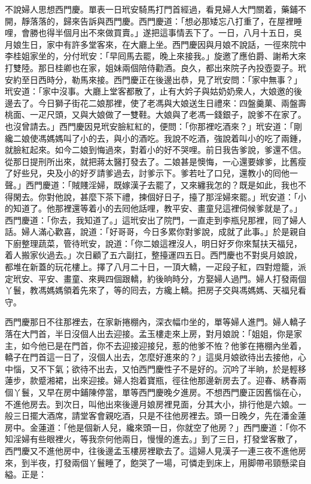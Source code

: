 不說婦人思想西門慶。單表一日玳安騎馬打門首經過，看見婦人大門關着，藥鋪不開，靜落落的，歸來告訴與西門慶。西門慶道：「想必那矮忘八打重了，在屋裡睡哩，會勝也得半個月出不來做買賣。」遂把這事情丟下了。一日，八月十五日，吳月娘生日，家中有許多堂客來，在大廳上坐。西門慶因與月娘不說話，一徑來院中李桂姐家坐的，分付玳安：「早囘馬去罷，晚上來接我。」旋邀了應伯爵、謝希大來打雙陸。那日桂卿也在家，姐妹兩個陪侍勸酒。良久，都出來院子內投壺耍子。玳安約至日西時分，勒馬來接。西門慶正在後邊出恭，見了玳安問：「家中無事？」玳安道：「家中沒事。大廳上堂客都散了，止有大妗子與姑奶奶衆人，大娘邀的後邊去了。今日獅子街花二娘那裡，使了老馮與大娘送生日禮來：{}四盤羹菓、兩盤壽桃面、一疋尺頭，又與大娘做了一雙鞋。大娘與了老馮一錢銀子，說爹不在家了。也沒曾請去。」{}西門慶因見玳安臉紅紅的，便問：「你那裡吃酒來？」玳安道：「剛纔二娘使馮媽媽叫了小的去，與小的酒吃。我說不吃酒，強說着叫小的吃了兩鍾，就臉紅起來。{}如今二娘到悔過來，對着小的好不哭哩。前日我告爹說，爹還不信。從那日提刑所出來，就把蔣太醫打發去了。二娘甚是懊悔，一心還要嫁爹，比舊瘦了好些兒，央及小的好歹請爹過去，討爹示下。爹若吐了口兒，還教小的囘他一聲。」西門慶道：「賊賤淫婦，既嫁漢子去罷了，又來纏我怎的？既是如此，我也不得閑去。你對他說，甚麼下茶下禮，揀個好日子，擡了那淫婦來罷。」{}玳安道：「小的知道了。他那裡還等着小的去囘他話哩，教平安、畫童兒這裡伺候爹就是了。」西門慶道：「你去，我知道了。」這玳安出了院門，一直走到李瓶兒那裡，囘了婦人話。婦人滿心歡喜，說道：「好哥哥，今日多累你對爹說，成就了此事。」於是親自下廚整理蔬菜，管待玳安，說道：「你二娘這裡沒人，明日好歹你來幫扶天福兒，着人搬家伙過去。」次日顧了五六副扛，整擡運四五日。西門慶也不對吳月娘說，都堆在新蓋的玩花樓上。擇了八月二十日，一頂大轎，一疋段子紅，四對燈籠，派定玳安、平安、畫童、來興四個跟轎，約後晌時分，方娶婦人過門。婦人打發兩個丫鬟，教馮媽媽領着先來了，等的囘去，方纔上轎。把房子交與馮媽媽、天福兒看守。

西門慶那日不往那裡去，在家新捲棚內，深衣幅巾坐的，單等婦人進門。婦人轎子落在大門首，半日沒個人出去迎接。{}孟玉樓走來上房，對月娘說：「姐姐，你是家主，如今他已是在門首，你不去迎接迎接兒，惹的他爹不恠？他爹在捲棚內坐着，轎子在門首這一日了，沒個人出去，怎麼好進來的？」這吳月娘欲待出去接他，心中惱，又不下氣；欲待不出去，又怕西門慶性子不是好的。沉吟了半晌，於是輕移蓮步，款蹙湘裙，出來迎接。婦人抱着寶瓶，徑往他那邊新房去了。迎春、綉春兩個丫鬟，又早在房中鋪陳停當，單等西門慶晚夕進房。不想西門慶正因舊惱在心，不進他房去。到次日，叫他出來後邊月娘房裡見面，分其大小，排行他是六娘。一般三日擺大酒席，請堂客會親吃酒，只是不往他房裡去。頭一日晚夕，先在潘金蓮房中。金蓮道：「他是個新人兒，{}纔來頭一日，你就空了他房？」西門慶道：「你不知淫婦有些眼裡火，等我奈何他兩日，慢慢的進去。」到了三日，打發堂客散了，西門慶又不進他房中，往後邊孟玉樓房裡歇去了。這婦人見漢子一連三夜不進他房來，到半夜，打發兩個丫鬟睡了，飽哭了一場，可憐走到床上，用脚帶弔頸懸梁自縊。{}正是：

